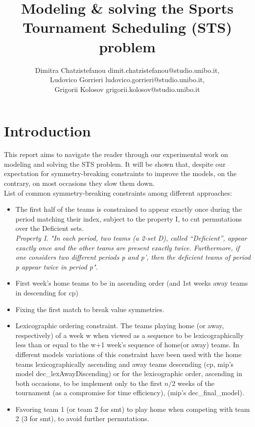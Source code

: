 \documentclass{article}
\title{\textbf{Modeling \& solving the Sports Tournament Scheduling (STS) problem}}
\author{Dimitra Chatzistefanou dimit.chatzistefanou@studio.unibo.it,\\  Ludovico Gorrieri ludovico.gorrieri@studio.unibo.it, \\ Grigorii Kolosov  grigorii.kolosov@studio.unibo.it}
\date{}
\begin{document}
\maketitle
\section{Introduction}
This report aims to navigate the reader through our experimental work on modeling and solving the STS problem. It will be shown that, despite our expectation for symmetry-breaking constraints to improve the models, on the contrary, on most occasions they slow them down. \\
List of common symmetry-breaking constraints among different approaches:
\begin{itemize}
    \item[(sb1)] The first half of the teams is constrained to appear exactly once during the period matching their index, subject to the property I, to cut permutations over the Deficient sets.\\
    \textit{Property I. "In each period, two teams (a 2-set D), called “Deficient”, appear exactly once and the other teams are present exactly twice. Furthermore, if one considers two different periods p and p', then the deficient teams of period p appear twice in period p".\cite{hamiez2008using} \cite{artictle}}

    \item [(sb2)]First week's home teams to be in ascending order (and 1st weeks away teams in descending for cp) 
    \item [(sb3)]Fixing the first match to break value symmetries.
    \item [(sb4)]Lexicographic ordering constraint. The teams playing home (or away, respectively) of a week w when viewed as a sequence to be lexicographically less than or equal to the w+1 week's sequence of home(or away) teams. In different models variations of this constraint have been used with the home teams lexicographically ascending and away teams descending (cp, mip's model dec\_lexAwayDiscending) or for the lexicographic order, ascending in both occasions, to be implement only to the first $n/2$ weeks of the tournament (as a compromise for time efficiency), (mip's dec\_final\_model).
    \item [(sb5)] Favoring team 1 (or team 2 for smt) to play home when competing with team 2 (3 for smt), to avoid further permutations.
\end{itemize}
\end{document}
